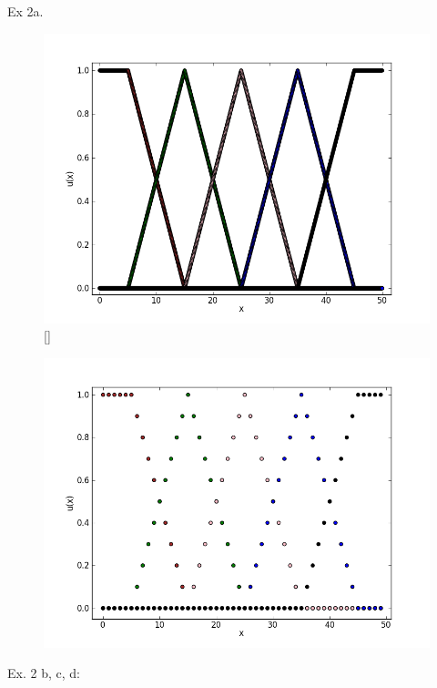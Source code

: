 \documentclass{report}
\begin{document}
\newpage

Ex 2a.
\begin{figure}[hptb]
\includegraphics[scale=0.5]{ex1b1000.png}
[]
\end{figure}
\begin{figure}[hptb]
\includegraphics[scale=0.5]{ex2a50.png}
\end{figure}

\newpage
Ex. 2 b, c, d:
\end{document}
